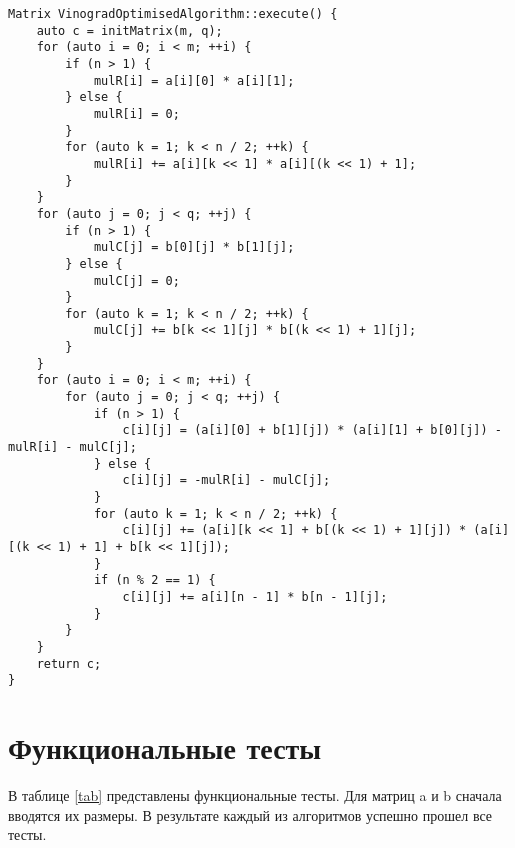 \begin{lstlisting}[label=lst:vinogradOpt,caption=Алгоритм Винограда с оптимизациями]
Matrix VinogradOptimisedAlgorithm::execute() {
	auto c = initMatrix(m, q);
	for (auto i = 0; i < m; ++i) {
		if (n > 1) {
			mulR[i] = a[i][0] * a[i][1];
		} else {
			mulR[i] = 0;
		}
		for (auto k = 1; k < n / 2; ++k) {
			mulR[i] += a[i][k << 1] * a[i][(k << 1) + 1];
		}
	}
	for (auto j = 0; j < q; ++j) {
		if (n > 1) {
			mulC[j] = b[0][j] * b[1][j];
		} else {
			mulC[j] = 0;
		}
		for (auto k = 1; k < n / 2; ++k) {
			mulC[j] += b[k << 1][j] * b[(k << 1) + 1][j];
		}
	}
	for (auto i = 0; i < m; ++i) {
		for (auto j = 0; j < q; ++j) {
			if (n > 1) {
				c[i][j] = (a[i][0] + b[1][j]) * (a[i][1] + b[0][j]) - mulR[i] - mulC[j];
			} else {
				c[i][j] = -mulR[i] - mulC[j];
			}
			for (auto k = 1; k < n / 2; ++k) {
				c[i][j] += (a[i][k << 1] + b[(k << 1) + 1][j]) * (a[i][(k << 1) + 1] + b[k << 1][j]);
			}
			if (n % 2 == 1) {
				c[i][j] += a[i][n - 1] * b[n - 1][j];
			}
		}
	}
	return c;
}
\end{lstlisting}

\section{Функциональные тесты}

В таблице \ref{tab} представлены функциональные тесты. Для матриц a и b сначала вводятся их размеры. В результате каждый из алгоритмов успешно прошел все тесты.

